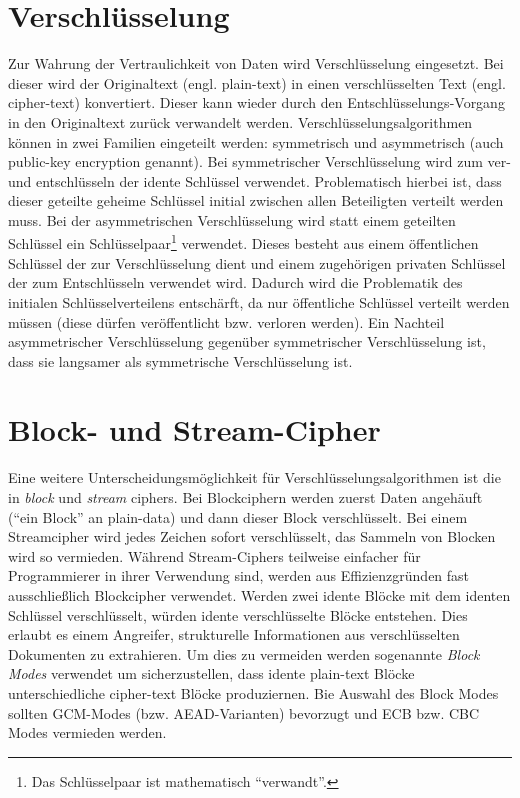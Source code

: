\section{Verschlüsselung}

Zur Wahrung der Vertraulichkeit von Daten wird Verschlüsselung eingesetzt. Bei dieser wird der Originaltext (engl. plain-text) in einen verschlüsselten Text (engl. cipher-text) konvertiert. Dieser kann wieder durch den Entschlüsselungs-Vorgang in den Originaltext zurück verwandelt werden. Verschlüsselungsalgorithmen können in zwei Familien eingeteilt werden: symmetrisch und asymmetrisch (auch public-key encryption genannt). Bei symmetrischer Verschlüsselung wird zum ver- und entschlüsseln der idente Schlüssel verwendet. Problematisch hierbei ist, dass dieser geteilte geheime Schlüssel initial zwischen allen Beteiligten verteilt werden muss. Bei der asymmetrischen Verschlüsselung wird statt einem geteilten Schlüssel ein Schlüsselpaar\footnote{Das Schlüsselpaar ist mathematisch ``verwandt''.} verwendet. Dieses besteht aus einem öffentlichen Schlüssel der zur Verschlüsselung dient und einem zugehörigen privaten Schlüssel der zum Entschlüsseln verwendet wird. Dadurch wird die Problematik des initialen Schlüsselverteilens entschärft, da nur öffentliche Schlüssel verteilt werden müssen (diese dürfen veröffentlicht bzw. verloren werden). Ein Nachteil asymmetrischer Verschlüsselung gegenüber symmetrischer Verschlüsselung ist, dass sie langsamer als symmetrische Verschlüsselung ist.

\section{Block- und Stream-Cipher}

Eine weitere Unterscheidungsmöglichkeit für Verschlüsselungsalgorithmen ist die in \textit{block} und \textit{stream} ciphers. Bei Blockciphern werden zuerst Daten angehäuft (``ein Block'' an plain-data) und dann dieser Block verschlüsselt. Bei einem Streamcipher wird jedes Zeichen sofort verschlüsselt, das Sammeln von Blocken wird so vermieden. Während Stream-Ciphers teilweise einfacher für Programmierer in ihrer Verwendung sind, werden aus Effizienzgründen fast ausschließlich Blockcipher verwendet. Werden zwei idente Blöcke mit dem identen Schlüssel verschlüsselt, würden idente verschlüsselte Blöcke entstehen. Dies erlaubt es einem Angreifer, strukturelle Informationen aus verschlüsselten Dokumenten zu extrahieren. Um dies zu vermeiden werden sogenannte \textit{Block Modes} verwendet um sicherzustellen, dass idente plain-text Blöcke unterschiedliche cipher-text Blöcke produziernen. Bie Auswahl des Block Modes sollten GCM-Modes (bzw. AEAD-Varianten) bevorzugt und ECB bzw. CBC Modes vermieden werden.

